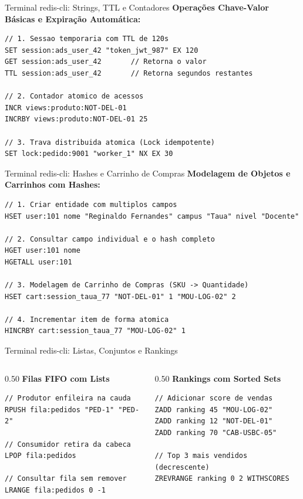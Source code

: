\begin{frame}[fragile]{Terminal redis-cli: Strings, TTL e Contadores}
  \textbf{Operações Chave-Valor Básicas e Expiração Automática:}
\begin{lstlisting}[basicstyle=\ttfamily\scriptsize]
// 1. Sessao temporaria com TTL de 120s
SET session:ads_user_42 "token_jwt_987" EX 120
GET session:ads_user_42       // Retorna o valor
TTL session:ads_user_42       // Retorna segundos restantes

// 2. Contador atomico de acessos
INCR views:produto:NOT-DEL-01
INCRBY views:produto:NOT-DEL-01 25

// 3. Trava distribuida atomica (Lock idempotente)
SET lock:pedido:9001 "worker_1" NX EX 30
\end{lstlisting}
\end{frame}

\begin{frame}[fragile]{Terminal redis-cli: Hashes e Carrinho de Compras}
  \textbf{Modelagem de Objetos e Carrinhos com Hashes:}
\begin{lstlisting}[basicstyle=\ttfamily\scriptsize]
// 1. Criar entidade com multiplos campos
HSET user:101 nome "Reginaldo Fernandes" campus "Taua" nivel "Docente"

// 2. Consultar campo individual e o hash completo
HGET user:101 nome
HGETALL user:101

// 3. Modelagem de Carrinho de Compras (SKU -> Quantidade)
HSET cart:session_taua_77 "NOT-DEL-01" 1 "MOU-LOG-02" 2

// 4. Incrementar item de forma atomica
HINCRBY cart:session_taua_77 "MOU-LOG-02" 1
\end{lstlisting}
\end{frame}

\begin{frame}[fragile]{Terminal redis-cli: Listas, Conjuntos e Rankings}
  \begin{columns}[T]
    \begin{column}{0.50\textwidth}
      \textbf{Filas FIFO com Lists}
\begin{lstlisting}[basicstyle=\ttfamily\tiny]
// Produtor enfileira na cauda
RPUSH fila:pedidos "PED-1" "PED-2"

// Consumidor retira da cabeca
LPOP fila:pedidos

// Consultar fila sem remover
LRANGE fila:pedidos 0 -1
\end{lstlisting}
    \end{column}

    \begin{column}{0.50\textwidth}
      \textbf{Rankings com Sorted Sets}
\begin{lstlisting}[basicstyle=\ttfamily\tiny]
// Adicionar score de vendas
ZADD ranking 45 "MOU-LOG-02"
ZADD ranking 12 "NOT-DEL-01"
ZADD ranking 70 "CAB-USBC-05"

// Top 3 mais vendidos (decrescente)
ZREVRANGE ranking 0 2 WITHSCORES
\end{lstlisting}
    \end{column}
  \end{columns}
\end{frame}
